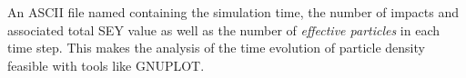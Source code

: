 An ASCII file named  containing the simulation time, the number of impacts and associated total SEY value as well as the number of \emph{effective particles} in each time step. This makes the analysis of the time evolution of particle density feasible with  tools like GNUPLOT.


